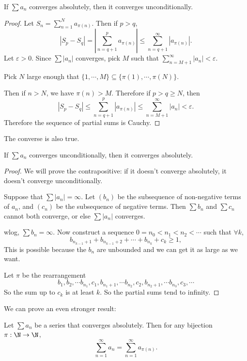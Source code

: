 \documentclass[a4paper]{article}
\begin{document}
\begin{thm}
  If $\sum a_n$ converges absolutely, then it converges unconditionally.
\end{thm}

\begin{proof}
  Let $S_n = \sum_{n = 1}^N a_{\pi (n)}$. Then if $p > q$,
  \[
    |S_p - S_q| = \left|\sum_{n = q + 1}^p a_{\pi(n)}\right| \leq \sum_{n = q + 1}^\infty|a_{\pi (n)}|.
  \]
  Let $\varepsilon > 0$. Since $\sum |a_n|$ converges, pick $M$ such that $\sum_{n = M + 1}^\infty|a_n| < \varepsilon$.

  Pick $N$ large enough that $\{1, \cdots, M\}\subseteq \{\pi (1), \cdots, \pi(N)\}$.

  Then if $n > N$, we have $\pi(n) > M$. Therefore if $p > q \geq N$, then
  \[
    |S_p - S_q| \leq \sum_{n = q + 1}^p |a_{\pi(n)}| \leq \sum_{n = M + 1}^\infty |a_n| < \varepsilon.
  \]
  Therefore the sequence of partial sums is Cauchy.
\end{proof}

The converse is also true.
\begin{thm}
  If $\sum a_n$ converges unconditionally, then it converges absolutely.
\end{thm}

\begin{proof}
  We will prove the contrapositive: if it doesn't converge absolutely, it doesn't converge unconditionally.

  Suppose that $\sum |a_n| = \infty$. Let $(b_n)$ be the subsequence of non-negative terms of $a_n$, and $(c_n)$ be the subsequence of negative terms. Then $\sum b_n$ and $\sum c_n$ cannot both converge, or else $\sum |a_n|$ converges.

  wlog, $\sum b_n = \infty$. Now construct a sequence $0 = n_0 < n_1 < n_2 < \cdots$ such that $\forall k$,
  \[
    b_{n_{k - 1} + 1} + b_{n_{k - 1} + 2} + \cdots + b_{n_k} + c_k \geq 1,
  \]
  This is possible because the $b_n$ are unbounded and we can get it as large as we want.

  Let $\pi$ be the rearrangement
  \[
    b_1, b_2, \cdots b_{n_1}, c_1, b_{n_1 + 1}, \cdots b_{n_2}, c_2, b_{n_2 + 1}, \cdots b_{n_3}, c_3,\cdots
  \]
  So the sum up to $c_k$ is at least $k$. So the partial sums tend to infinity.
\end{proof}

We can prove an even stronger result:
\begin{lemma}
 Let $\sum a_n$ be a series that converges absolutely. Then for any bijection $\pi: \N\to \N$,
 \[
   \sum_{n = 1}^\infty a_n = \sum_{n = 1}^\infty a_{\pi(n)}.
 \]
\end{lemma}
\end{document}
